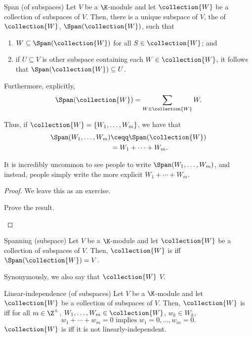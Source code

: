 \begin{thm}{Span (of subspaces)}{}
	Let $V$ be a $\K$-module and let $\collection{W}$ be a collection of subspaces of $V$.  Then, there is a unique subspace of $V$, the  of $\collection{W}$, $\Span (\collection{W})$, such that
	\begin{enumerate}
		\item $W\subseteq \Span (\collection{W})$ for all $S\in \collection{W}$; and
		\item if $U\subseteq V$ is other subspace containing each $W\in \collection{W}$, it follows that $\Span (\collection{W})\subseteq U$.
	\end{enumerate}
	Furthermore, explicitly,
	\begin{equation}
		\Span (\collection{W})=\sum _{W\in \collection{W}}W.
	\end{equation}
	\begin{rmk}
		Thus, if $\collection{W}=\{ W_1,\ldots ,W_m\}$, we have that
		\begin{equation}
			\begin{split}
				\Span (W_1,\ldots ,W_m) & \ceqq \Span (\collection{W}) \\
				& =W_1+\cdots +W_m.
			\end{split}
		\end{equation}
	\end{rmk}
	\begin{rmk}
		It is incredibly uncommon to see people to write $\Span (W_1,\ldots ,W_m)$, and instead, people simply write the more explicit $W_1+\cdots +W_m$.
	\end{rmk}
	\begin{proof}
		We leave this as an exercise.
		\begin{exr}[breakable=false]{}{}
			Prove the result.
		\end{exr}
	\end{proof}
\end{thm}
\begin{dfn}{Spanning (subspace)}{}
	Let $V$ be a $\K$-module and let $\collection{W}$ be a collection of subspaces of $V$.  Then, $\collection{W}$ is  iff $\Span (\collection{W})=V$.
	\begin{rmk}
		Synonymously, we also say that $\collection{W}$  $V$.
	\end{rmk}
\end{dfn}
\begin{dfn}{Linear-independence (of subspa\-ces)}{}
	Let $V$ be a $\K$-module and let $\collection{W}$  be a collection of subspaces of $V$.  Then, $\collection{W}$ is  iff for all $m\in \Z ^+$, $W_1,\ldots ,W_m\in \collection{W}$, $w_k\in W_k$,
	\begin{equation}
		w_1+\cdots +w_m=0\text{ implies }w_1=0,\ldots ,w_m=0.
	\end{equation}
	$\collection{W}$ is  iff it is not linearly-independent.
\end{dfn}
